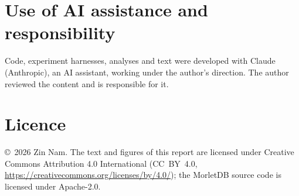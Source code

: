\documentclass[sigconf,nonacm]{acmart}
\begin{document}
\section*{Use of AI assistance and responsibility}
Code, experiment harnesses, analyses and text were developed with Claude (Anthropic), an AI assistant, working under the author's direction. The author reviewed the content and is responsible for it.

\section*{Licence}
\copyright~2026 Zin Nam. The text and figures of this report are licensed under Creative Commons Attribution 4.0 International (CC~BY~4.0, \url{https://creativecommons.org/licenses/by/4.0/}); the MorletDB source code is licensed under Apache-2.0.



\end{document}
